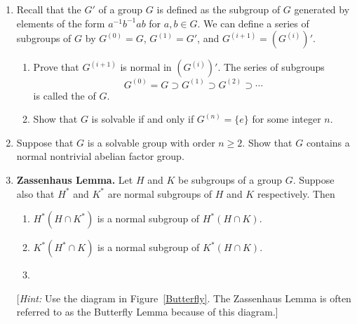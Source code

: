 {\begin{enumerate}
\item
Recall that the  $G'$ of a group $G$ is
defined as the subgroup of $G$ generated by elements of the form
$a^{-1} b ^{-1} ab$ for $a, b \in G$.  We can define a series of
subgroups of $G$ by $G^{(0)} = G$, $G^{(1)} = G'$, and $G^{(i+1)} =
(G^{(i)})'$.
\begin{enumerate}
 
\item
Prove that $G^{(i+1)}$ is normal in $(G^{(i)})'$.  The series of
subgroups
\[
G^{(0)} = G \supset G^{(1)} \supset G^{(2)} \supset \cdots
\]
is called the  of $G$.
 
\item
Show that $G$ is solvable if and only if $G^{(n)} = \{ e \}$ for some
integer $n$.
 
\end{enumerate}
 
 
\item
Suppose that $G$ is a solvable group with order $n \geq 2$.
Show that $G$ contains a normal nontrivial abelian factor group.
 
 
 
 
\item
\textbf{Zassenhaus Lemma.}
Let $H$ and $K$ be subgroups of a group $G$. Suppose also that $H^*$
and $K^*$ are normal subgroups of $H$ and $K$ respectively.  Then
\begin{enumerate}
 
\item
$H^* ( H \cap K^*)$ is a normal subgroup of $H^* ( H \cap K)$.
 
\item
$K^* ( H^* \cap K)$ is a normal subgroup of $K^* ( H \cap K)$.
 
\item
{}
 

\end{enumerate}
[\emph{Hint:} Use the diagram in Figure~\ref{Butterfly}. The Zassenhaus Lemma is often
referred to as the Butterfly Lemma because of this diagram.]
\begin{figure}[htb]



\end{figure}
\end{enumerate}}
